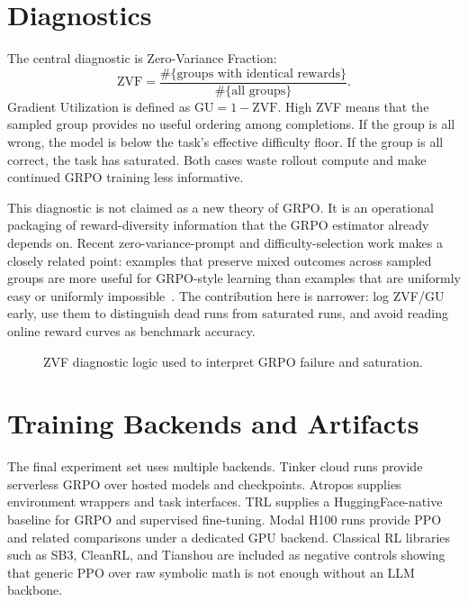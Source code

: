 \documentclass[12pt,a4paper]{report}
\newcommand{\zvf}{\mathrm{ZVF}}
\newcommand{\gu}{\mathrm{GU}}
\newcommand{\fitdiagram}[1]{\resizebox{\textwidth}{!}{}}
\begin{document}
\section{Diagnostics}
\label{sec:diagnostics}

The central diagnostic is Zero-Variance Fraction:
\begin{equation}
  \zvf = \frac{\#\{\text{groups with identical rewards}\}}{\#\{\text{all groups}\}}.
\end{equation}
Gradient Utilization is defined as $\gu=1-\zvf$. High ZVF means that the sampled group provides no useful ordering among completions. If the group is all wrong, the model is below the task's effective difficulty floor. If the group is all correct, the task has saturated. Both cases waste rollout compute and make continued GRPO training less informative.

This diagnostic is not claimed as a new theory of GRPO. It is an operational packaging of reward-diversity information that the GRPO estimator already depends on. Recent zero-variance-prompt and difficulty-selection work makes a closely related point: examples that preserve mixed outcomes across sampled groups are more useful for GRPO-style learning than examples that are uniformly easy or uniformly impossible~\citep{rlzvp2025,bae2025online,rcgrpo2026,pikus2025hardexamples}. The contribution here is narrower: log ZVF/GU early, use them to distinguish dead runs from saturated runs, and avoid reading online reward curves as benchmark accuracy.

\begin{figure}[ht]
  \centering
  \fitdiagram{../../../platform_tinker/reports/final/tikz/zvf_diagnostic.tex}
  \caption{ZVF diagnostic logic used to interpret GRPO failure and saturation.}
  \label{fig:zvf-diagnostic}
\end{figure}

\section{Training Backends and Artifacts}
\label{sec:training-backends}

The final experiment set uses multiple backends. Tinker cloud runs provide serverless GRPO over hosted models and checkpoints. Atropos supplies environment wrappers and task interfaces. TRL supplies a HuggingFace-native baseline for GRPO and supervised fine-tuning. Modal H100 runs provide PPO and related comparisons under a dedicated GPU backend. Classical RL libraries such as SB3, CleanRL, and Tianshou are included as negative controls showing that generic PPO over raw symbolic math is not enough without an LLM backbone.
\end{document}
